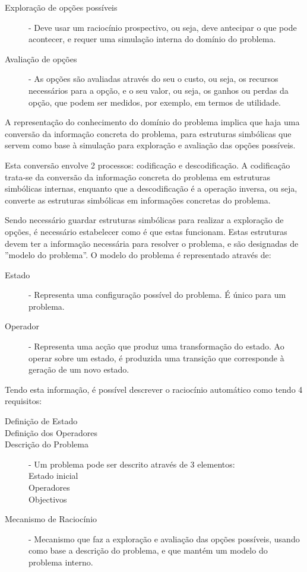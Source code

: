 \documentclass[a4paper,12pt]{article}
\begin{document}
\begin{description}
	\item[Exploração de opções possíveis] - Deve usar um raciocínio prospectivo, ou seja, deve antecipar o que pode acontecer, e requer uma simulação interna do domínio do problema.
	\item[Avaliação de opções] - As opções são avaliadas através do seu o custo, ou seja, os recursos necessários para a opção, e o seu valor, ou seja, os ganhos ou perdas da opção, que podem ser medidos, por exemplo, em termos de utilidade.
\end{description}

A representação do conhecimento do domínio do problema implica que haja uma conversão da informação concreta do problema, para estruturas simbólicas que servem como base à simulação para exploração e avaliação das opções possíveis.

Esta conversão envolve 2 processos: codificação e descodificação.
A codificação trata-se da conversão da informação concreta do problema em estruturas simbólicas internas, enquanto que a descodificação é a operação inversa, ou seja, converte as estruturas simbólicas em informações concretas do problema.

Sendo necessário guardar estruturas simbólicas para realizar a exploração de opções, é necessário estabelecer como é que estas funcionam.
Estas estruturas devem ter a informação necessária para resolver o problema, e são designadas de ''modelo do problema''. O modelo do problema é representado através de:

\begin{description}
	\item[Estado] - Representa uma configuração possível do problema. É único para um problema.
	\item[Operador] - Representa uma acção que produz uma transformação do estado. Ao operar sobre um estado, é produzida uma transição que corresponde à geração de um novo estado.
\end{description}

Tendo esta informação, é possível descrever o raciocínio automático como tendo 4 requisitos:

\begin{description}
	\item[Definição de Estado]
	\item[Definição dos Operadores]
	\item[Descrição do Problema] - Um problema pode ser descrito através de 3 elementos:\hfill \\
		Estado inicial \hfill \\
		Operadores \hfill \\
		Objectivos
	\item[Mecanismo de Raciocínio] - Mecanismo que faz a exploração e avaliação das opções possíveis, usando como base a descrição do problema, e que mantém um modelo do problema interno.
\end{description}
\end{document}
